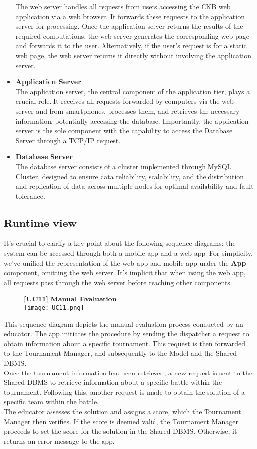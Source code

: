 \documentclass{article}
\begin{document}
\begin{itemize}
    The web server handles all requests from users accessing the CKB web application via a web browser. It forwards these requests to the application server for processing. Once the application server returns the results of the required computations, the web server generates the corresponding web page and forwards it to the user. Alternatively, if the user's request is for a static web page, the web server returns it directly without involving the application server.
    \item \textbf{Application Server} \\
    The application server, the central component of the application tier, plays a crucial role. It receives all requests forwarded by computers via the web server and from smartphones, processes them, and retrieves the necessary information, potentially accessing the database. Importantly, the application server is the sole component with the capability to access the Database Server through a TCP/IP request.
    \item \textbf{Database Server} \\
    The database server consists of a cluster implemented through MySQL Cluster, designed to ensure data reliability, scalability, and the distribution and replication of data across multiple nodes for optimal availability and fault tolerance.
\end{itemize}

\subsection{Runtime view}
It's crucial to clarify a key point about the following sequence diagrams: the system can be accessed through both a mobile app and a web app. For simplicity, we've unified the representation of the web app and mobile app under the \textbf{App} component, omitting the web server. It's implicit that when using the web app, all requests pass through the web server before reaching other components.

\begin{figure}[H]
    \centering
    \textbf{[UC11] Manual Evaluation} \\
    \texttt{[image: UC11.png]}
\end{figure}
\noindent
This sequence diagram depicts the manual evaluation process conducted by an educator. The app initiates the procedure by sending the dispatcher a request to obtain information about a specific tournament. This request is then forwarded to the Tournament Manager, and subsequently to the Model and the Shared DBMS. \\
Once the tournament information has been retrieved, a new request is sent to the Shared DBMS to retrieve information about a specific battle within the tournament. Following this, another request is made to obtain the solution of a specific team within the battle. \\
The educator assesses the solution and assigns a score, which the Tournament Manager then verifies. If the score is deemed valid, the Tournament Manager proceeds to set the score for the solution in the Shared DBMS. Otherwise, it returns an error message to the app. \\
\end{document}

